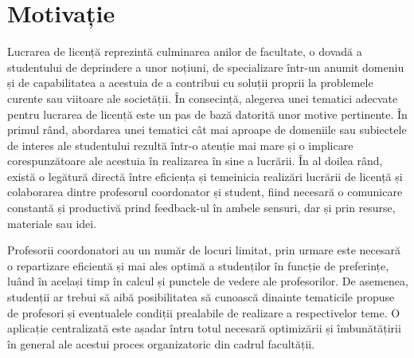 \chapter*{Motivație} 

Lucrarea de licență reprezintă culminarea anilor de facultate, o dovadă a studentului de deprindere a unor noțiuni, de specializare într-un anumit domeniu și de capabilitatea a acestuia de a contribui cu soluții proprii la problemele curente sau viitoare ale societății. În consecință, alegerea unei tematici adecvate pentru lucrarea de licență este un pas de bază datorită unor motive pertinente.
În primul rând, abordarea unei tematici cât mai aproape de domeniile sau subiectele de interes ale studentului rezultă într-o atenție mai mare și o implicare corespunzătoare ale acestuia în realizarea în sine a lucrării.
În al doilea rând, există o legătură directă între eficiența și temeinicia realizări lucrării de licență și colaborarea dintre profesorul coordonator și student, fiind necesară o comunicare constantă și productivă prind feedback-ul în ambele sensuri, dar și prin resurse, materiale sau idei.

Profesorii coordonatori au un număr de locuri limitat, prin urmare este necesară o repartizare eficientă și mai ales optimă a studenților în funcție de preferințe, luând în același timp în calcul și punctele de vedere ale profesorilor. De asemenea, studenții ar trebui să aibă posibilitatea să cunoască dinainte tematicile propuse de profesori și eventualele condiții prealabile de realizare a respectivelor teme. O aplicație centralizată este așadar întru totul necesară optimizării și îmbunătățirii în general ale acestui proces organizatoric din cadrul facultății.